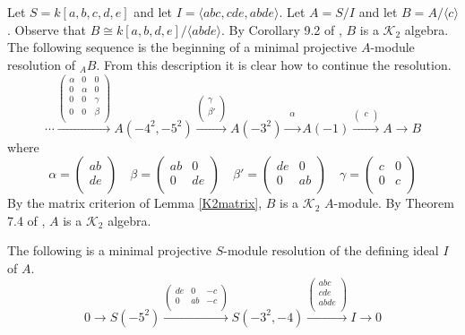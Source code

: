 \documentclass[11pt,righttag]{amsart}
\begin{document}
\begin{example}
\label{TowerCounter}
Let $S=k[a,b,c,d,e]$ and let $I={\langle} abc, cde, abde{\rangle}$. Let $A=S/I$ and let $B=A/{\langle} c{\rangle}$.
 Observe that  $B\cong k[a,b,d,e]/{\langle} abde{\rangle}$.  By Corollary 9.2 of \cite{CS}, $B$ is a ${{\mathcal K}}_2$ algebra. The following sequence is the beginning of a minimal projective $A$-module resolution of $_AB$. From this description it is clear how to continue the resolution.
$$\cdots\xrightarrow{\begin{pmatrix} \alpha  & 0 & 0\\  0 & \alpha & 0\\ 0 & 0 & \gamma\\ 0 & 0 & \beta\\ \end{pmatrix}} A(-4^2, -5^2)\xrightarrow{\begin{pmatrix} \gamma\\ \beta' \\ \end{pmatrix}}A(-3^2)\xrightarrow{\begin{matrix}\alpha\\ \end{matrix}}A(-1) \xrightarrow{\begin{pmatrix} c\\ \end{pmatrix}} A\rightarrow B$$
where
$$\alpha = \begin{pmatrix} ab\\ de\\ \end{pmatrix}\quad \beta=\begin{pmatrix} ab & 0\\ 0 & de\\ \end{pmatrix}\quad \beta'=\begin{pmatrix} de & 0\\ 0 & ab\\ \end{pmatrix}\quad \gamma = \begin{pmatrix} c & 0\\ 0 & c\\ \end{pmatrix}$$
 By the matrix criterion of Lemma \ref{K2matrix}, $B$ is a ${{\mathcal K}}_2$ $A$-module. By Theorem 7.4 of \cite{CS}, $A$ is a ${{\mathcal K}}_2$ algebra.

The following is a minimal projective $S$-module resolution of the defining ideal $I$ of $A$.
$$0\rightarrow S(-5^2)\xrightarrow{\begin{pmatrix} de & 0 & -c\\ 0 & ab &-c\\ \end{pmatrix}} S(-3^2,-4)\xrightarrow{\begin{pmatrix} abc\\ cde\\ abde\\ \end{pmatrix}} I\rightarrow 0$$


\end{example}
\end{document}
